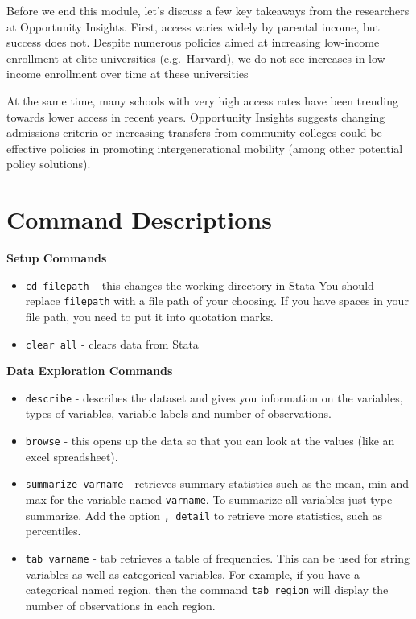 \documentclass[
]{book}
\begin{document}
Before we end this module, let's discuss a few key takeaways from the researchers at Opportunity Insights. First, access varies widely by parental income, but success does not. Despite numerous policies aimed at increasing low-income enrollment at elite universities (e.g.~Harvard), we do not see increases in low-income enrollment over time at these universities

At the same time, many schools with very high access rates have been trending towards lower access in recent years. Opportunity Insights suggests changing admissions criteria or increasing transfers from community colleges could be effective policies in promoting intergenerational mobility (among other potential policy solutions).

\section*{Command Descriptions}\label{command-descriptions}

\textbf{Setup Commands}

\begin{itemize}
\item
  \texttt{cd\ filepath} -- this changes the working directory in Stata You should replace
  \texttt{filepath} with a file path of your choosing. If you have spaces in your file path, you need to put it into quotation marks.
\item
  \texttt{clear\ all} - clears data from Stata
\end{itemize}

\textbf{Data Exploration Commands}

\begin{itemize}
\item
  \texttt{describe} - describes the dataset and gives you information on the variables, types of variables, variable labels and number of observations.
\item
  \texttt{browse} - this opens up the data so that you can look at the values (like an excel spreadsheet).
\item
  \texttt{summarize\ varname} - retrieves summary statistics such as the mean, min and max for the variable named \texttt{varname}. To summarize all variables just type summarize. Add the option \texttt{,\ detail} to retrieve more statistics, such as percentiles.
\item
  \texttt{tab\ varname} - tab retrieves a table of frequencies. This can be used for string variables as well as categorical variables. For example, if you have a categorical named region, then the command \texttt{tab\ region} will display the number of observations in each region.
\end{itemize}
\end{document}

